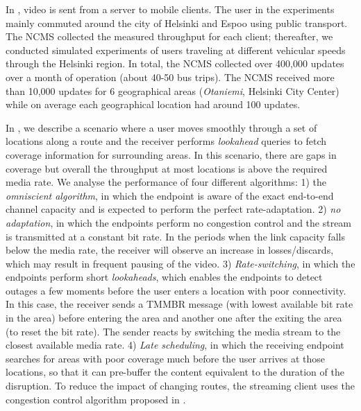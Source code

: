 In , video is sent from a server to mobile clients. The user
in the experiments mainly commuted around the city of Helsinki and Espoo using
public transport. The NCMS collected the measured throughput for each client;
thereafter, we conducted simulated experiments of users traveling at different
vehicular speeds through the Helsinki region. In total, the NCMS collected
over 400,000 updates over a month of operation (about 40-50 bus trips). The
NCMS received more than 10,000 updates for 6 geographical areas
(\emph{Otaniemi}, Helsinki City Center) while on average each geographical
location had around 100 updates.

In , we describe a scenario where a user moves smoothly
through a set of locations along a route and the receiver performs
\emph{lookahead} queries to fetch coverage information for surrounding areas.
In this scenario, there are gaps in coverage but overall the throughput at
most locations is above the required media rate. We analyse the performance of
four different algorithms: 1) the \emph{omniscient algorithm}, in which the
endpoint is aware of the exact end-to-end channel capacity and is expected to
perform the perfect rate-adaptation. 2) \emph{no adaptation}, in which the endpoints
perform no congestion control and the stream is transmitted at a constant bit
rate. In the periods when the link capacity falls below the media rate, the 
receiver will observe an increase in losses/discards, which may result in 
frequent pausing of the video. 3) \emph{Rate-switching}, in which the endpoints perform short
\emph{lookaheads}, which enables the endpoints to detect outages a few moments
before the user enters a location with poor connectivity. In this case, the
receiver sends a TMMBR message (with lowest available bit rate in the area)
before entering the area and another one after the exiting the area (to reset
the bit rate). The sender reacts by switching the media stream to the closest
available media rate. 4) \emph{Late scheduling}, in which the receiving endpoint
searches for areas with poor coverage much before the user arrives at those
locations, so that it can pre-buffer the content equivalent to the duration of
the disruption. To reduce the impact of changing routes, the streaming client
uses the congestion control algorithm proposed in .

